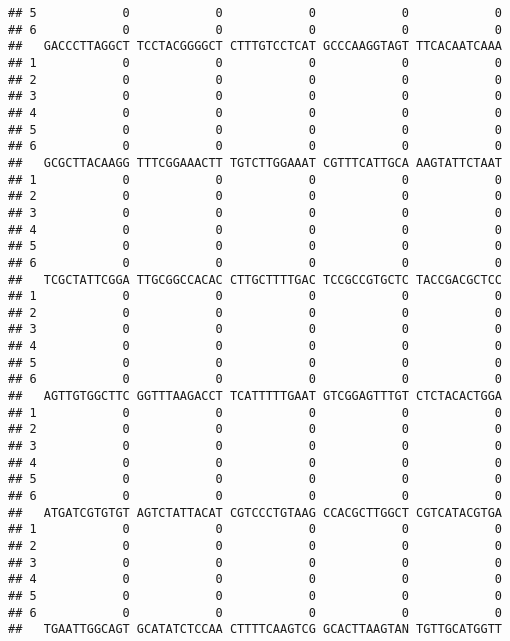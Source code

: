 \documentclass[]{article}
\begin{document}
\begin{verbatim}
## 5            0            0            0            0            0
## 6            0            0            0            0            0
##   GACCCTTAGGCT TCCTACGGGGCT CTTTGTCCTCAT GCCCAAGGTAGT TTCACAATCAAA
## 1            0            0            0            0            0
## 2            0            0            0            0            0
## 3            0            0            0            0            0
## 4            0            0            0            0            0
## 5            0            0            0            0            0
## 6            0            0            0            0            0
##   GCGCTTACAAGG TTTCGGAAACTT TGTCTTGGAAAT CGTTTCATTGCA AAGTATTCTAAT
## 1            0            0            0            0            0
## 2            0            0            0            0            0
## 3            0            0            0            0            0
## 4            0            0            0            0            0
## 5            0            0            0            0            0
## 6            0            0            0            0            0
##   TCGCTATTCGGA TTGCGGCCACAC CTTGCTTTTGAC TCCGCCGTGCTC TACCGACGCTCC
## 1            0            0            0            0            0
## 2            0            0            0            0            0
## 3            0            0            0            0            0
## 4            0            0            0            0            0
## 5            0            0            0            0            0
## 6            0            0            0            0            0
##   AGTTGTGGCTTC GGTTTAAGACCT TCATTTTTGAAT GTCGGAGTTTGT CTCTACACTGGA
## 1            0            0            0            0            0
## 2            0            0            0            0            0
## 3            0            0            0            0            0
## 4            0            0            0            0            0
## 5            0            0            0            0            0
## 6            0            0            0            0            0
##   ATGATCGTGTGT AGTCTATTACAT CGTCCCTGTAAG CCACGCTTGGCT CGTCATACGTGA
## 1            0            0            0            0            0
## 2            0            0            0            0            0
## 3            0            0            0            0            0
## 4            0            0            0            0            0
## 5            0            0            0            0            0
## 6            0            0            0            0            0
##   TGAATTGGCAGT GCATATCTCCAA CTTTTCAAGTCG GCACTTAAGTAN TGTTGCATGGTT

\end{verbatim}
\end{document}
